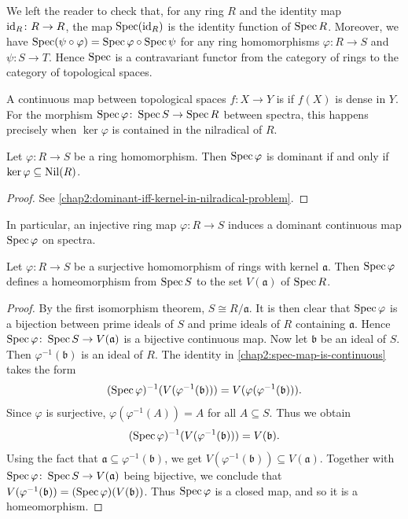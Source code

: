 We left the reader to check that, for any ring $R$ and the identity map $\operatorname{id}_R \colon R \to R$, the map $\operatorname{Spec}(\operatorname{id}_R)$ is the identity function of $\operatorname{Spec} R$. Moreover, we have $\operatorname{Spec}(\psi \circ \varphi) = \operatorname{Spec}\varphi \circ \operatorname{Spec} \psi$ for any ring homomorphisms $\varphi\colon R \to S$ and $\psi \colon S \to T$. Hence $\operatorname{Spec}$ is a contravariant functor from the category of rings to the category of topological spaces.

A continuous map between topological spaces $f \colon X \to Y$ is  if $f(X)$ is dense in $Y$. For the morphism $\operatorname{Spec} \varphi \colon \operatorname{Spec} S \to \operatorname{Spec} R$ between spectra, this happens precisely when $\ker \varphi$ is contained in the nilradical of $R$.

\begin{corollary}\label{chap2:dominant-iff-kernel-in-nilradical}
	Let $\varphi \colon R \to S$ be a ring homomorphism. Then $\operatorname{Spec} \varphi$ is dominant if and only if $\ker \varphi \subseteq \operatorname{Nil}(R)$.
\end{corollary}
\begin{proof}
	See \cref{chap2:dominant-iff-kernel-in-nilradical-problem}.
\end{proof}

In particular, an injective ring map $\varphi \colon R \to S$ induces a dominant continuous map $\operatorname{Spec} \varphi$ on spectra.

\begin{proposition}
	Let $\varphi \colon R \to S$ be a surjective homomorphism of rings with kernel $\mathfrak{a}$. Then $\operatorname{Spec} \varphi$ defines a homeomorphism from $\operatorname{Spec} S$ to the set $V(\mathfrak{a})$ of $\operatorname{Spec} R$.
\end{proposition}

\begin{proof}
	By the first isomorphism theorem, $S \cong R/\mathfrak{a}$. It is then clear that $\operatorname{Spec} \varphi$ is a bijection between prime ideals of $S$ and prime ideals of $R$ containing $\mathfrak{a}$. Hence $\operatorname{Spec} \varphi \colon \operatorname{Spec} S \to V(\mathfrak{a})$ is a bijective continuous map. Now let $\mathfrak{b}$ be an ideal of $S$. Then $\varphi^{-1}(\mathfrak{b})$ is an ideal of $R$. The identity in \cref{chap2:spec-map-is-continuous} takes the form 
	\begin{equation*}
		(\operatorname{Spec} \varphi)^{-1}(V(\varphi^{-1}(\mathfrak{b}))) = V(\varphi(\varphi^{-1}(\mathfrak{b}))).
	\end{equation*}
	Since $\varphi$ is surjective, $\varphi(\varphi^{-1}(A)) = A$ for all $A \subseteq S$. Thus we obtain
	\begin{equation*}
		(\operatorname{Spec} \varphi)^{-1}(V(\varphi^{-1}(\mathfrak{b}))) = V(\mathfrak{b}).
	\end{equation*}
	Using the fact that $\mathfrak{a} \subseteq \varphi^{-1}(\mathfrak{b})$, we get $V(\varphi^{-1}(\mathfrak{b})) \subseteq V(\mathfrak{a})$. Together with $\operatorname{Spec} \varphi \colon \operatorname{Spec} S \to V(\mathfrak{a})$ being bijective, we conclude that $V(\varphi^{-1}(\mathfrak{b})) = (\operatorname{Spec} \varphi) (V(\mathfrak{b}))$. Thus $\operatorname{Spec} \varphi$ is a closed map, and so it is a homeomorphism.
\end{proof}

